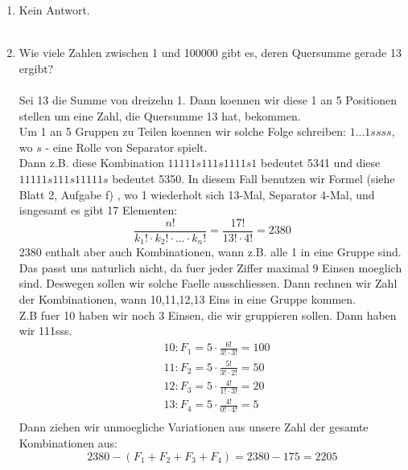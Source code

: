 \begin{enumerate}[label=(\alph*)]
        \item Kein Antwort.\\\\

        \item Wie viele Zahlen zwischen 1 und 100000 gibt es, deren Quersumme gerade 13 ergibt?\\\\
        Sei 13 die Summe von dreizehn 1. Dann koennen wir diese 1 an 5 Positionen 
        stellen um eine Zahl, die Quersumme 13 hat, bekommen.\\
        Um 1 an 5 Gruppen zu Teilen koennen wir solche Folge schreiben:
        $1...1 s s s s$, wo $s$ - eine Rolle von Separator spielt.\\ Dann z.B. diese
        Kombination $11111s111s1111s1$ bedeutet 5341 und diese $11111s111s11111s$
        bedeutet 5350. In diesem Fall benutzen wir Formel (siehe Blatt 2, Aufgabe f)
        , wo 1 wiederholt sich 13-Mal, Separator 4-Mal, und isngesamt es gibt 17 Elementen:
        \[\frac{n!}{k_1!\cdot k_2!\cdot\ldots\cdot k_n!} = \frac{17!}{13!\cdot4!} = 2380\]
        2380 enthalt aber auch Kombinationen, wann z.B. alle 1 in eine Gruppe sind. 
        Das passt uns naturlich nicht, da fuer jeder Ziffer maximal 9 Einsen moeglich sind.
        Deswegen sollen wir solche Faelle ausschliessen. Dann rechnen wir Zahl der 
        Kombinationen, wann 10,11,12,13 Eins in eine Gruppe kommen. \\
        Z.B fuer 10 haben wir noch 3 Einsen, die wir gruppieren sollen. Dann haben wir 111sss.
        \begin{align*}
        	&10: F_1 = 5 \cdot \frac{6!}{3!\cdot3!} = 100\\
        	&11: F_2 = 5 \cdot \frac{5!}{3!\cdot2!} = 50\\
        	&12: F_3 = 5 \cdot \frac{4!}{1!\cdot3!} = 20\\
        	&13: F_4 = 5 \cdot \frac{4!}{0!\cdot4!} = 5\\
        \end{align*}
        Dann ziehen wir unmoegliche Variationen aus unsere Zahl der gesamte Kombinationen aus:
        \[2380 - (F_1+F_2+F_3+F_4) = 2380 - 175 = 2205\]
    \end{enumerate}
